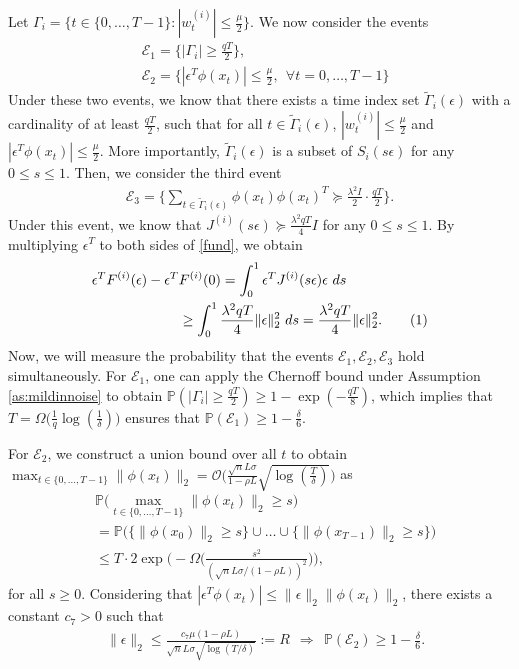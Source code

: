 \documentclass[letterpaper,10pt,conference]{ieeeconf}
\newcommand\numberthis{\addtocounter{equation}{1}\tag{\theequation}}
\theoremstyle{plain} %
\theoremstyle{plain} %
\theoremstyle{plain} %
\theoremstyle{plain}
\begin{document}
  Let $\Gamma_i = \{t\in\{0,\dots, T-1\}: |w_t^{(i)}| \le \frac{\mu}{2}\}$. 
   We now consider the events
   \begin{align*}
     &  \mathcal{E}_1 = \Bigr\{|\Gamma_i|\ge \frac{qT}{2}\Bigr\}, \\& \mathcal{E}_2 = \bigr\{  |\epsilon^T \phi(x_t)| \le \frac{\mu}{2}, ~~\forall t=0,\dots, T-1\bigr\}
   \end{align*}
Under these two events, we know that there exists a time index set $\tilde{\Gamma}_i(\epsilon)$ with a cardinality of at least $\frac{qT}{2}$, such that for all $t \in \tilde{\Gamma}_i(\epsilon)$, $|w_t^{(i)}| \le \frac{\mu}{2}$ and $|\epsilon^T \phi(x_t)| \le \frac{\mu}{2}$. More importantly, $\tilde{\Gamma}_i(\epsilon)$ is a subset of $S_i(s\epsilon)$ for any $0 \le s \le 1$.
 Then, we consider the third event
\begin{align*}
    \mathcal{E}_3 = \Bigr\{  \sum_{t\in \tilde \Gamma_i(\epsilon)} \phi(x_t) \phi(x_t)^T \succeq \frac{\lambda^2 I}{2} \cdot \frac{qT}{2}  \Bigr\}.
\end{align*}
Under this event, we know that $J^{(i)}(s\epsilon)\succeq \frac{\lambda^2 qT }{4}I$ for any $0\le s\le 1$. 
By multiplying $\epsilon^T$ to both sides of \eqref{fund}, we obtain 
\begin{align*}
    \epsilon^T F^{(i)}(\epsilon) -\epsilon^T& F^{(i)}(0) = \int_0^1 \epsilon^T J^{(i)}(s\epsilon) \epsilon~ ds\\&\ge \int_0^1 \frac{\lambda^2 qT }{4}\|\epsilon\|_2^2 ~ds =\frac{\lambda^2 qT }{4}\|\epsilon\|_2^2.\numberthis\label{epseps}
\end{align*}
Now, we will measure the probability that the events $\mathcal{E}_1, \mathcal{E}_2, \mathcal{E}_3$ hold simultaneously. 
For $\mathcal{E}_1$, one can apply the Chernoff bound under Assumption \ref{as:mildinnoise} to obtain $\mathbb{P}(|\Gamma_i| \ge \frac{qT}{2})\ge 1-\exp(-\frac{qT}{8})$, which implies that 
 $T=\Omega\bigr( \frac{1}{q} \log(\frac{1}{\delta})\bigr)$ ensures that $\mathbb{P}(\mathcal{E}_1)\ge1-\frac{\delta}{6}$.


For $\mathcal{E}_2$, we construct a union bound over all $t$ to obtain $\max_{t\in\{0,\dots,T-1\}} \|\phi(x_t)\|_2  = \mathcal{O} \bigr(\frac{\sqrt{n} L\sigma}{1-\rho L}\sqrt{\log(\frac{T}{\delta})}\bigr)$ as
\begin{align*}
       & \mathbb{P}\bigr(\max_{t\in\{0,\dots, T-1\}}\|\phi(x_t)\|_2\ge s\bigr) \\&= \mathbb{P}\bigr(\{\|\phi(x_0)\|_2\ge s\}\cup \dots \cup \{\|\phi(x_{T-1})\|_2\ge s\}\bigr)\\&\le T \cdot 2\exp\Bigr(-\Omega\Bigr(\frac{s^2}{(\sqrt{n}L\sigma  / (1-\rho L))^2}\Bigr)\Bigr),
    \end{align*}
    for all $s\ge 0$. Considering that $|\epsilon^T \phi(x_t)|\le \|\epsilon\|_2 \|\phi(x_t)\|_2$, 
there exists a constant $c_7>0$ such that 
\begin{align*}\label{epsR}
   & \|\epsilon\|_2 \le \frac{c_7\mu (1-\rho L)}{\sqrt{n}L \sigma\sqrt{\log(T/\delta)} }:=R ~~\Longrightarrow  ~~\mathbb{P}\left(\mathcal{E}_2 \right)\ge 1-\frac{\delta}{6}.
\end{align*}
\end{document}
